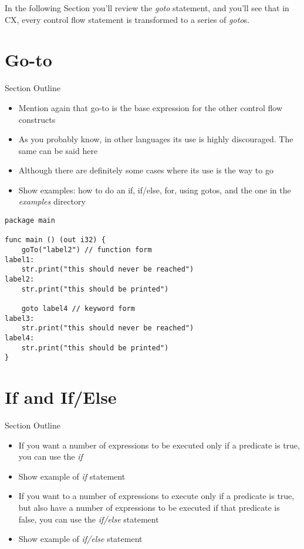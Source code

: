 \documentclass[11pt,fleqn,openany]{book} %
\begin{document}
In the following Section you'll review the \emph{goto} statement, and you'll see that in CX, every control flow statement is transformed to a series of \emph{goto}s.

\section{Go-to}

\begin{remark}
Section Outline
    \begin{itemize}
    	\item Mention again that go-to is the base expression for the other control flow constructs
        \item As you probably know, in other languages its use is highly discouraged. The same can be said here
        \item Although there are definitely some cases where its use is the way to go
        \item Show examples: how to do an if, if/else, for, using gotos, and the one in the \textit{examples} directory
    \end{itemize}
\end{remark}

\begin{lstlisting}[caption={Using Go to for Control Flow},captionpos=b,label={listing:go-to-example1}]
package main

func main () (out i32) {
	goTo("label2") // function form
label1:
	str.print("this should never be reached")
label2:
	str.print("this should be printed")

	goto label4 // keyword form
label3:
	str.print("this should never be reached")
label4:
	str.print("this should be printed")
}
\end{lstlisting}

\section{If and If/Else}

\begin{remark}
Section Outline
    \begin{itemize}
    	\item If you want a number of expressions to be executed only if a predicate is true, you can use the \textit{if}
        \item Show example of \textit{if} statement
        \item If you want to a number of expressions to execute only if a predicate is true, but also have a number of expressions to be executed if that predicate is false, you can use the \textit{if/else} statement
        \item Show example of \textit{if/else} statement
    \end{itemize}
\end{remark}
\end{document}
